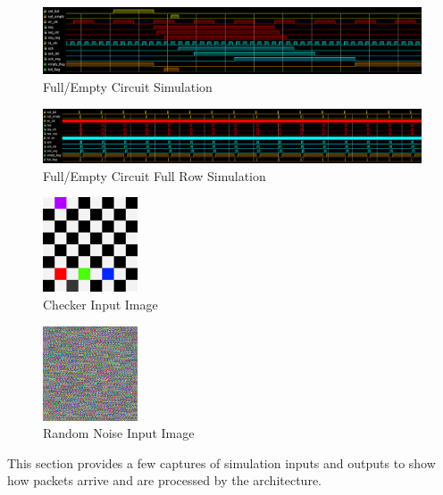 
\label{chap:experimental_results}

\begin{figure}
    \centering
    \includegraphics[width=1.0\textwidth]{fig/full_empty_sim.png}
    \caption{Full/Empty Circuit Simulation}
    \label{fig:full_empty_sim}
\end{figure}

\begin{figure}
    \centering
    \includegraphics[width=1.0\textwidth]{fig/full_empty_row_sim.png}
    \caption{Full/Empty Circuit Full Row Simulation}
    \label{fig:full_empty_row_sim}
\end{figure}


\begin{figure}
    \centering
    \includegraphics[width=0.25\textwidth]{fig/checker.png}
    \caption{Checker Input Image}
    \label{fig:checker_pattern}
\end{figure}

\begin{figure}
    \centering
    \includegraphics[width=0.25\textwidth]{fig/random_noise.png}
    \caption{Random Noise Input Image}
    \label{fig:random_noise}
\end{figure}

This section provides a few captures of simulation inputs and outputs to show how packets arrive and are processed by the architecture.

